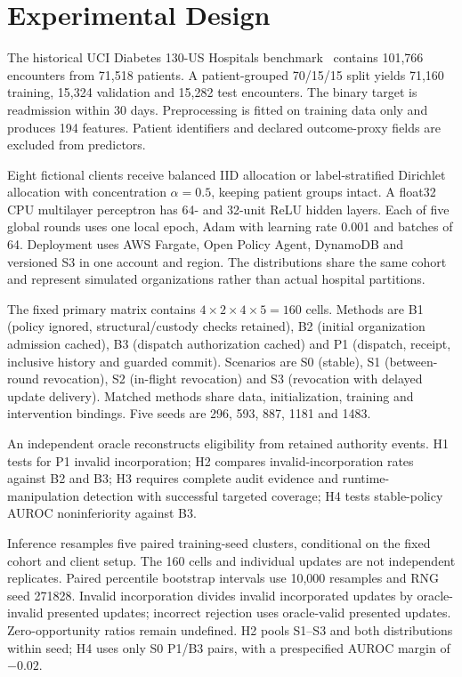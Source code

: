 \documentclass[conference,letterpaper]{IEEEtran}
\newcommand{\method}{P1}
\begin{document}
\section{Experimental Design}
The historical UCI Diabetes 130-US Hospitals benchmark~\cite{uci} contains 101,766 encounters from 71,518 patients. A patient-grouped 70/15/15 split yields 71,160 training, 15,324 validation and 15,282 test encounters. The binary target is readmission within 30 days. Preprocessing is fitted on training data only and produces 194 features. Patient identifiers and declared outcome-proxy fields are excluded from predictors.

Eight fictional clients receive balanced IID allocation or label-stratified Dirichlet allocation with concentration $\alpha=0.5$, keeping patient groups intact. A float32 CPU multilayer perceptron has 64- and 32-unit ReLU hidden layers. Each of five global rounds uses one local epoch, Adam with learning rate 0.001 and batches of 64. Deployment uses AWS Fargate, Open Policy Agent, DynamoDB and versioned S3 in one account and region. The distributions share the same cohort and represent simulated organizations rather than actual hospital partitions.

The fixed primary matrix contains $4\times2\times4\times5=160$ cells. Methods are B1 (policy ignored, structural/custody checks retained), B2 (initial organization admission cached), B3 (dispatch authorization cached) and \method{} (dispatch, receipt, inclusive history and guarded commit). Scenarios are S0 (stable), S1 (between-round revocation), S2 (in-flight revocation) and S3 (revocation with delayed update delivery). Matched methods share data, initialization, training and intervention bindings. Five seeds are 296, 593, 887, 1181 and 1483.

An independent oracle reconstructs eligibility from retained authority events. H1 tests for P1 invalid incorporation; H2 compares invalid-incorporation rates against B2 and B3; H3 requires complete audit evidence and runtime-manipulation detection with successful targeted coverage; H4 tests stable-policy AUROC noninferiority against B3.

Inference resamples five paired training-seed clusters, conditional on the fixed cohort and client setup. The 160 cells and individual updates are not independent replicates. Paired percentile bootstrap intervals use 10,000 resamples and RNG seed 271828. Invalid incorporation divides invalid incorporated updates by oracle-invalid presented updates; incorrect rejection uses oracle-valid presented updates. Zero-opportunity ratios remain undefined. H2 pools S1--S3 and both distributions within seed; H4 uses only S0 P1/B3 pairs, with a prespecified AUROC margin of $-0.02$.
\end{document}
